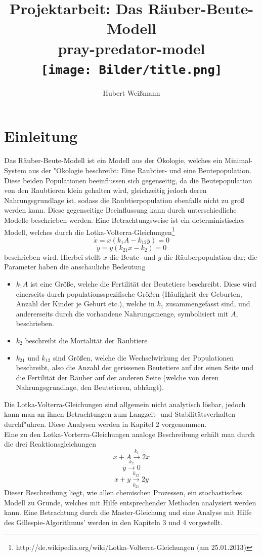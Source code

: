 \documentclass[11pt]{article}
\begin{document}
\begin{titlepage}
\title{\textbf{\Huge{Projektarbeit: Das Räuber-Beute-Modell}} \\ \large{pray-predator-model}\\ \texttt{[image: Bilder/title.png]}}
\author{Hubert Weißmann}
\maketitle
\end{titlepage}
\tableofcontents

\section{Einleitung}
Das Räuber-Beute-Modell ist ein Modell aus der Ökologie, welches ein Minimal-System aus der "Okologie beschreibt: Eine Raubtier- und eine Beutepopulation. Diese beiden Populationen beeinflussen sich gegenseitig, da die Beutepopulation von den Raubtieren klein gehalten wird, gleichzeitig jedoch deren Nahrungsgrundlage ist, sodass die Raubtierpopulation ebenfalls nicht zu groß werden kann. Diese gegenseitige Beeinflussung kann durch unterschiedliche Modelle beschrieben werden.
Eine Betrachtungsweise ist ein deterministisches Modell, welches durch die Lotka-Volterra-Gleichungen\footnote{http://de.wikipedia.org/wiki/Lotka-Volterra-Gleichungen (am 25.01.2013)}
$$\dot x=x(k_1 A-k_{12}y)=0$$
$$\dot y=y(k_{21}x-k_2)=0$$
beschrieben wird.
Hierbei stellt $x$ die Beute- und $y$ die Räuberpopulation dar; die Parameter haben die anschauliche Bedeutung
\begin{itemize}
   \item $k_1 A$ ist eine Größe, welche die Fertilität der Beutetiere beschreibt. Diese wird einerseits durch populationsspezifische Größen (Häufigkeit der Geburten, Anzahl der Kinder je Geburt etc.), welche in $k_1$ zusammengefasst sind, und andererseits durch die vorhandene Nahrungsmenge, symbolisiert mit $A$, beschrieben.
   \item $k_2$ beschreibt die Mortalität der Raubtiere
   \item $k_{21}$ und $k_{12}$ sind Größen, welche die Wechselwirkung der Populationen beschreibt, also die Anzahl der gerissenen Beutetiere auf der einen Seite und die Fertilität der Räuber auf der anderen Seite (welche von deren Nahrungsgrundlage, den Beutetieren, abhängt).
\end{itemize}

Die Lotka-Volterra-Gleichungen sind allgemein nicht analytisch lösbar, jedoch kann man an ihnen Betrachtungen zum Langzeit- und Stabilitätsverhalten durchf"uhren. Diese Analysen werden in Kapitel 2 vorgenommen.\\
Eine zu den Lotka-Vorterra-Gleichungen analoge Beschreibung erhält man durch die drei Reaktionsgleichungen
$$x+A \xrightarrow{k_1} 2x $$
$$y  \xrightarrow{k_2}0$$
$$x+y \xrightarrow[k_{21}]{k_{12}} 2y $$
Dieser Beschreibung liegt, wie allen chemischen Prozessen, ein stochastisches Modell zu Grunde, welches mit Hilfe entsprechender Methoden analysiert werden kann. Eine Betrachtung durch die Master-Gleichung und eine Analyse mit Hilfe des Gillespie-Algorithmus' werden in den Kapiteln 3 und 4 vorgestellt.
\end{document}
